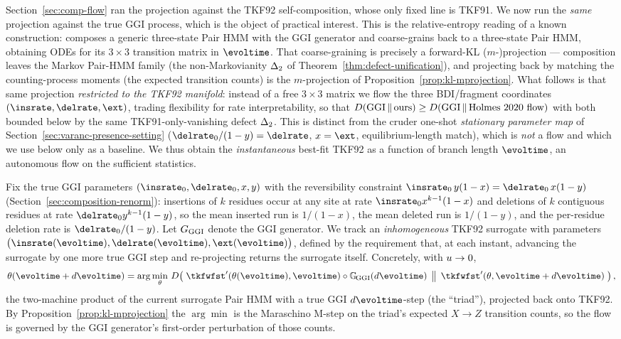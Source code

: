 Section~\ref{sec:comp-flow} ran the projection against the TKF92
self-composition, whose only fixed line is TKF91.  We now run the
\emph{same} projection against the true GGI process, which is the object of
practical interest.  This is the relative-entropy reading of a known
construction: \citet{Holmes2020} composes a generic three-state Pair HMM with
the GGI generator and coarse-grains back to a three-state Pair HMM, obtaining
ODEs for its $3{\times}3$ transition matrix in $\evoltime$.  That coarse-graining
is precisely a forward-KL ($m$-)projection --- composition leaves the Markov
Pair-HMM family (the non-Markovianity $\Delta_2$ of
Theorem~\ref{thm:defect-unification}), and projecting back by matching the
counting-process moments (the expected transition counts) is the $m$-projection
of Proposition~\ref{prop:kl-mprojection}.  What follows is that same projection
\emph{restricted to the TKF92 manifold}: instead of a free $3{\times}3$ matrix
we flow the three BDI/fragment coordinates $(\insrate,\delrate,\ext)$, trading
flexibility for rate interpretability, so that
$D\!\left(\mathrm{GGI}\,\middle\|\,\text{ours}\right)\ge D\!\left(\mathrm{GGI}\,\middle\|\,\text{Holmes 2020 flow}\right)$
with both bounded below by the same TKF91-only-vanishing defect $\Delta_2$.
This is distinct from the cruder one-shot \emph{stationary parameter map} of
Section~\ref{sec:varanc-presence-setting} ($\delrate_0/(1-y)=\delrate$,
$x=\ext$, equilibrium-length match), which is \emph{not} a flow and which we use
below only as a baseline.  We thus obtain the \emph{instantaneous} best-fit
TKF92 as a function of branch length $\evoltime$, an autonomous flow on the
sufficient statistics.

Fix the true GGI parameters $(\insrate_0,\delrate_0,x,y)$ with the
reversibility constraint $\insrate_0\,y(1-x)=\delrate_0\,x(1-y)$
(Section~\ref{sec:composition-renorm}): insertions of $k$ residues occur at any
site at rate $\insrate_0 x^{k-1}(1-x)$ and deletions of $k$ contiguous residues
at rate $\delrate_0 y^{k-1}(1-y)$, so the mean inserted run is $1/(1-x)$, the
mean deleted run is $1/(1-y)$, and the per-residue deletion rate is
$\delrate_0/(1-y)$.  Let $G_{\mathrm{GGI}}$ denote the GGI generator.  We track an
\emph{inhomogeneous} TKF92 surrogate with parameters
$\big(\insrate(\evoltime),\delrate(\evoltime),\ext(\evoltime)\big)$, defined by
the requirement that, at each instant, advancing the surrogate by one more
true GGI step and re-projecting returns the surrogate itself.  Concretely, with
$u\to0$,
\begin{equation}
\label{eq:ggi-triad}
\theta(\evoltime+d\evoltime)
  = \arg\min_\theta\,
    \dkl{\;\tkfwfst'(\theta(\evoltime),\evoltime)\circ\ggikern_{\!\ggi}(d\evoltime)\;}
        {\;\tkfwfst'(\theta,\evoltime+d\evoltime)\;},
\end{equation}
the two-machine product of the current surrogate Pair HMM with a true GGI
$d\evoltime$-step (the ``triad''), projected back onto TKF92.  By
Proposition~\ref{prop:kl-mprojection} the $\arg\min$ is the Maraschino M-step on
the triad's expected $X\!\to\!Z$ transition counts, so the flow is governed by
the GGI generator's first-order perturbation of those counts.

